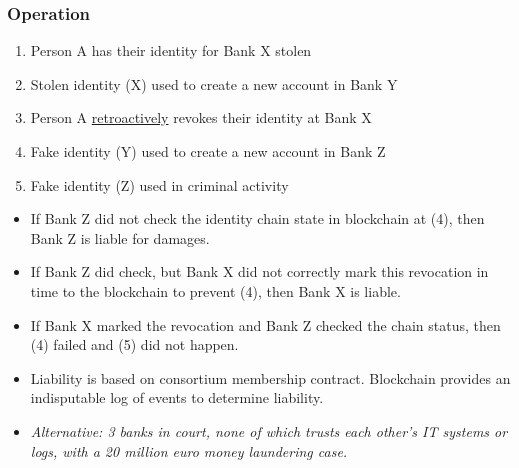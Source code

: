 \documentclass[8pt,final,xcolor={usenames,x11names}]{beamer}
\begin{document}
\begin{frame}[fragile]
\frametitle{Operation}
\begin{enumerate}
 \item Person A has their identity for \colorbox{PaleTurquoise1>wheel,1,5}{Bank X} stolen
 \item \colorbox{PaleTurquoise1>wheel,1,5}{Stolen identity (X)} used to create a new account in \colorbox{PaleTurquoise1>wheel,2,5}{Bank Y}
 \item Person A \underline{retroactively} revokes their identity at \colorbox{PaleTurquoise1>wheel,1,5}{Bank X}
 \item \colorbox{PaleTurquoise1>wheel,2,5}{Fake identity (Y)} used to create a new account in \colorbox{PaleTurquoise1}{Bank Z}
 \item \colorbox{PaleTurquoise1}{Fake identity (Z)} used in criminal activity
\end{enumerate}
\begin{itemize}
 \item If \colorbox{PaleTurquoise1}{Bank Z} did not check the identity chain state in blockchain at (4), then \colorbox{PaleTurquoise1}{Bank Z} is liable for damages.
 \item If \colorbox{PaleTurquoise1}{Bank Z} did check, but \colorbox{PaleTurquoise1>wheel,1,5}{Bank X} did not correctly mark this revocation in time to the blockchain to prevent (4), then \colorbox{PaleTurquoise1>wheel,1,5}{Bank X} is liable.
 \item If \colorbox{PaleTurquoise1>wheel,1,5}{Bank X} marked the revocation and \colorbox{PaleTurquoise1}{Bank Z} checked the chain status, then (4) failed and (5) did not happen.
 \item Liability is based on consortium membership contract. Blockchain provides an indisputable log of events to determine liability.
 \item \emph{Alternative: 3 banks in court, none of which trusts each other's IT systems or logs, with a 20 million euro money laundering case.}
\end{itemize}

\end{frame}
\end{document}
